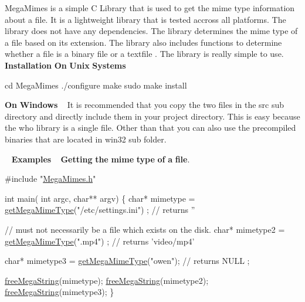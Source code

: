 Mega\+Mimes is a simple C Library that is used to get the mime type information about a file. It is a lightweight library that is tested accross all platforms. The library does not have any dependencies. The library determines the mime type of a file based on its extension. The library also includes functions to determine whether a file is a binary file or a textfile . The library is really simple to use. ~\newline
~\newline
 {\bfseries Installation} {\bfseries On} {\bfseries Unix} {\bfseries Systems} 
\begin{DoxyCode}
cd MegaMimes 
./configure
make
sudo make install  
\end{DoxyCode}


{\bfseries On} {\bfseries Windows} ~\newline
 It is recommended that you copy the two files in the src sub directory and directly include them in your project directory. This is easy because the who library is a single file. Other than that you can also use the precompiled binaries that are located in win32 sub folder.

~\newline
 {\bfseries Examples} ~\newline
 {\bfseries Getting} {\bfseries the} {\bfseries mime} {\bfseries type} {\bfseries of} {\bfseries a} {\bfseries file}.~\newline

\begin{DoxyCode}
\textcolor{preprocessor}{#include "\hyperlink{MegaMimes_8h}{MegaMimes.h}"}
 
 \textcolor{keywordtype}{int} main( \textcolor{keywordtype}{int} argc, \textcolor{keywordtype}{char}** argv)
 \{
    \textcolor{keywordtype}{char}* mimetype  = \hyperlink{MegaMimes_8h_a9fdc19822a29a3903d5687855f4256f6}{getMegaMimeType}(\textcolor{stringliteral}{"/etc/settings.ini"}) ; \textcolor{comment}{// returns ''}
    
    \textcolor{comment}{// must not necessarily be a file which exists on the disk. }
    \textcolor{keywordtype}{char}* mimetype2 = \hyperlink{MegaMimes_8h_a9fdc19822a29a3903d5687855f4256f6}{getMegaMimeType}(\textcolor{stringliteral}{".mp4"}) ; \textcolor{comment}{// returns 'video/mp4'}
    
    \textcolor{keywordtype}{char}* mimetype3 = \hyperlink{MegaMimes_8h_a9fdc19822a29a3903d5687855f4256f6}{getMegaMimeType}(\textcolor{stringliteral}{"owen"}); \textcolor{comment}{// returns NULL ;}

    \hyperlink{MegaMimes_8h_a874430e1d8513e70586046e68907039c}{freeMegaString}(mimetype);
    \hyperlink{MegaMimes_8h_a874430e1d8513e70586046e68907039c}{freeMegaString}(mimetype2);
    \hyperlink{MegaMimes_8h_a874430e1d8513e70586046e68907039c}{freeMegaString}(mimetype3);
 \}
\end{DoxyCode}


